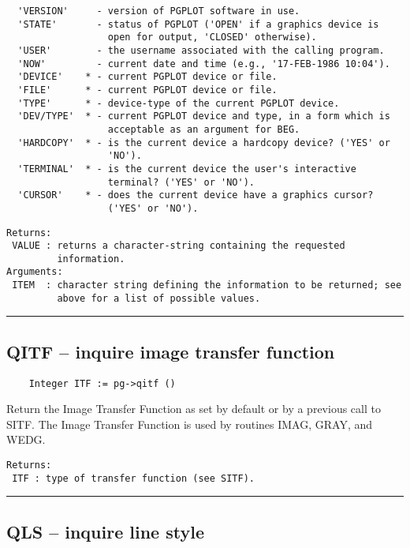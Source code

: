 \begin{verbatim}
  'VERSION'     - version of PGPLOT software in use.
  'STATE'       - status of PGPLOT ('OPEN' if a graphics device is
                  open for output, 'CLOSED' otherwise). 
  'USER'        - the username associated with the calling program. 
  'NOW'         - current date and time (e.g., '17-FEB-1986 10:04'). 
  'DEVICE'    * - current PGPLOT device or file.
  'FILE'      * - current PGPLOT device or file.
  'TYPE'      * - device-type of the current PGPLOT device.
  'DEV/TYPE'  * - current PGPLOT device and type, in a form which is
                  acceptable as an argument for BEG. 
  'HARDCOPY'  * - is the current device a hardcopy device? ('YES' or
                  'NO'). 
  'TERMINAL'  * - is the current device the user's interactive
                  terminal? ('YES' or 'NO'). 
  'CURSOR'    * - does the current device have a graphics cursor?
                  ('YES' or 'NO'). 
\end{verbatim}

\begin{verbatim}
Returns:
 VALUE : returns a character-string containing the requested
         information. 
Arguments:
 ITEM  : character string defining the information to be returned; see
         above for a list of possible values. 
\end{verbatim}

\hrule

\subsection*{QITF -- inquire image transfer function }

\begin{verbatim}
    Integer ITF := pg->qitf ()
\end{verbatim}

Return the Image Transfer Function as set by default or by a previous
call to SITF.  The Image Transfer Function is used by routines IMAG,
GRAY, and WEDG.

\begin{verbatim}
Returns:
 ITF : type of transfer function (see SITF).
\end{verbatim}

\hrule

\subsection*{QLS -- inquire line style }

